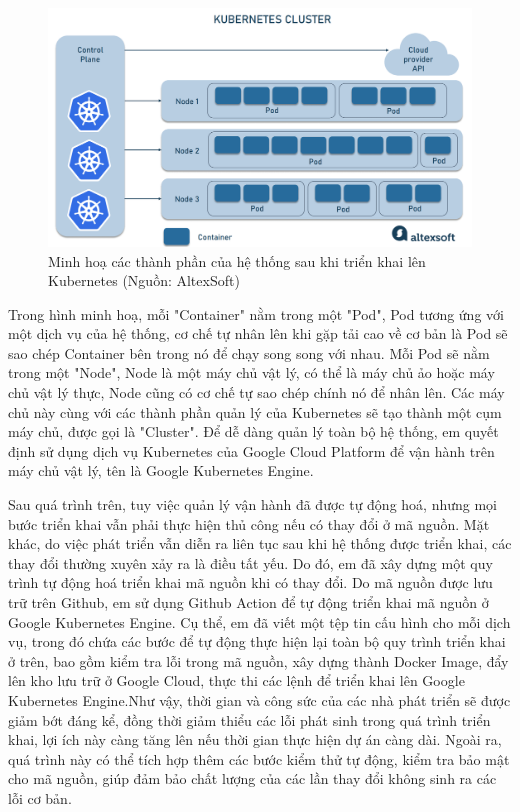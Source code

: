 \documentclass[../DoAn.tex]{subfiles}
\begin{document}
\begin{figure}[H]
    \centering
    \includegraphics[width=1.0\linewidth]{Hinhve/Example_Kubernetes.png}
    \caption{Minh hoạ các thành phần của hệ thống sau khi triển khai lên Kubernetes (Nguồn: AltexSoft)}
    \label{fig:Example_Kubernetes}
\end{figure}

Trong hình minh hoạ, mỗi "Container" nằm trong một "Pod", Pod tương ứng với một dịch vụ của hệ thống, cơ chế tự nhân lên khi gặp tải cao về cơ bản là Pod sẽ sao chép
Container bên trong nó để chạy song song với nhau. Mỗi Pod sẽ nằm trong một "Node", Node là một máy chủ vật lý, có thể là máy chủ ảo hoặc máy chủ vật lý thực, Node cũng có cơ chế tự sao chép chính nó
để nhân lên. Các máy chủ này cùng với các thành phần quản lý của Kubernetes sẽ tạo thành một cụm máy chủ, được gọi là "Cluster". Để dễ dàng quản lý toàn bộ hệ thống, em quyết định
sử dụng dịch vụ Kubernetes của Google Cloud Platform để vận hành trên máy chủ vật lý, tên là Google Kubernetes Engine.

Sau quá trình trên, tuy việc quản lý vận hành đã được tự động hoá, nhưng mọi bước triển khai vẫn phải thực hiện thủ công nếu có thay đổi ở mã nguồn. Mặt khác,
do việc phát triển vẫn diễn ra liên tục sau khi hệ thống được triển khai, các thay đổi thường xuyên xảy ra là điều tất yếu. Do đó, em đã xây dựng một quy trình tự động hoá triển khai mã nguồn
khi có thay đổi. Do mã nguồn được lưu trữ trên Github, em sử dụng Github Action để tự động triển khai mã nguồn ở Google Kubernetes Engine. Cụ thể, em đã viết một tệp tin cấu hình cho mỗi dịch vụ,
trong đó chứa các bước để tự động thực hiện lại toàn bộ quy trình triển khai ở trên, bao gồm kiểm tra lỗi trong mã nguồn, xây dựng thành Docker Image, đẩy lên kho lưu trữ ở Google Cloud,
thực thi các lệnh để triển khai lên Google Kubernetes Engine.Như vậy, thời gian và công sức của các nhà phát triển sẽ được giảm bớt đáng kể, đồng thời giảm thiểu
các lỗi phát sinh trong quá trình triển khai, lợi ích này càng tăng lên nếu thời gian thực hiện dự án càng dài. Ngoài ra, quá trình này có thể tích hợp thêm
các bước kiểm thử tự động, kiểm tra bảo mật cho mã nguồn, giúp đảm bảo chất lượng của các lần thay đổi không sinh ra các lỗi cơ bản.
\end{document}
